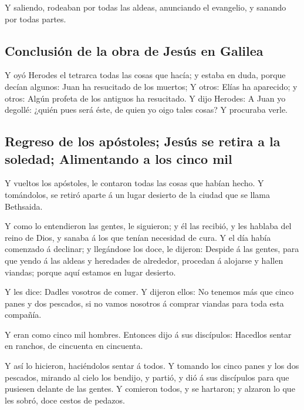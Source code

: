  Y saliendo, rodeaban por todas las aldeas, anunciando el
evangelio, y sanando por todas partes.

\hypertarget{conclusiuxf3n-de-la-obra-de-jesuxfas-en-galilea}{%
\subsection{Conclusión de la obra de Jesús en
Galilea}\label{conclusiuxf3n-de-la-obra-de-jesuxfas-en-galilea}}

 Y oyó Herodes el tetrarca todas las cosas que hacía; y
estaba en duda, porque decían algunos: Juan ha resucitado de los
muertos;  Y otros: Elías ha aparecido; y otros: Algún
profeta de los antiguos ha resucitado.  Y dijo Herodes: A
Juan yo degollé: ¿quién pues será éste, de quien yo oigo tales cosas? Y
procuraba verle.

\hypertarget{regreso-de-los-apuxf3stoles-jesuxfas-se-retira-a-la-soledad-alimentando-a-los-cinco-mil}{%
\subsection{Regreso de los apóstoles; Jesús se retira a la soledad;
Alimentando a los cinco
mil}\label{regreso-de-los-apuxf3stoles-jesuxfas-se-retira-a-la-soledad-alimentando-a-los-cinco-mil}}

 Y vueltos los apóstoles, le contaron todas las cosas que
habían hecho. Y tomándolos, se retiró aparte á un lugar desierto de la
ciudad que se llama Bethsaida.

 Y como lo entendieron las gentes, le siguieron; y él las
recibió, y les hablaba del reino de Dios, y sanaba á los que tenían
necesidad de cura.  Y el día había comenzado á declinar;
y llegándose los doce, le dijeron: Despide á las gentes, para que yendo
á las aldeas y heredades de alrededor, procedan á alojarse y hallen
viandas; porque aquí estamos en lugar desierto.

 Y les dice: Dadles vosotros de comer. Y dijeron ellos:
No tenemos más que cinco panes y dos pescados, si no vamos nosotros á
comprar viandas para toda esta compañía.

 Y eran como cinco mil hombres. Entonces dijo á sus
discípulos: Hacedlos sentar en ranchos, de cincuenta en cincuenta.

 Y así lo hicieron, haciéndolos sentar á todos.
 Y tomando los cinco panes y los dos pescados, mirando al
cielo los bendijo, y partió, y dió á sus discípulos para que pusiesen
delante de las gentes.  Y comieron todos, y se hartaron;
y alzaron lo que les sobró, doce cestos de pedazos.


